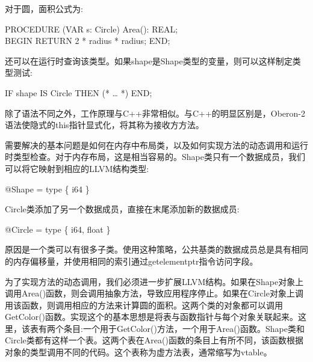 对于圆，面积公式为:\par

\begin{tcolorbox}[colback=white,colframe=black]
PROCEDURE (VAR s: Circle) Area(): REAL; \\
BEGIN RETURN 2 * radius * radius; END;
\end{tcolorbox}

还可以在运行时查询该类型。如果shape是Shape类型的变量，则可以这样制定类型测试:\par

\begin{tcolorbox}[colback=white,colframe=black]
IF shape IS Circle THEN (* … *) END;
\end{tcolorbox}

除了语法不同之外，工作原理与C++非常相似。与C++的明显区别是，Oberon-2语法使隐式的this指针显式化，将其称为接收方方法。\par

需要解决的基本问题是如何在内存中布局类，以及如何实现方法的动态调用和运行时类型检查。对于内存布局，这是相当容易的。Shape类只有一个数据成员，我们可以将它映射到相应的LLVM结构类型:\par

\begin{tcolorbox}[colback=white,colframe=black]
@Shape = type \{ i64 \}
\end{tcolorbox}

Circle类添加了另一个数据成员，直接在末尾添加新的数据成员:\par

\begin{tcolorbox}[colback=white,colframe=black]
@Circle = type \{ i64, float \}
\end{tcolorbox}

原因是一个类可以有很多子类。使用这种策略，公共基类的数据成员总是具有相同的内存偏移量，并使用相同的索引通过getelementptr指令访问字段。\par

为了实现方法的动态调用，我们必须进一步扩展LLVM结构。如果在Shape对象上调用Area()函数，则会调用抽象方法，导致应用程序停止。如果在Circle对象上调用该函数，则调用相应的方法来计算圆的面积。这两个类的对象都可以调用GetColor()函数。实现这个的基本思想是将表与函数指针与每个对象关联起来。这里，该表有两个条目:一个用于GetColor()方法，一个用于Area()函数。Shape类和Circle类都有这样一个表。这两个表在Area()函数的条目上有所不同，该函数根据对象的类型调用不同的代码。这个表称为虚方法表，通常缩写为vtable。\par

